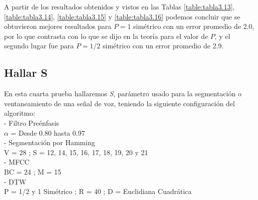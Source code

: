 A partir de los resultados obtenidos y vistos en las Tablas \ref{table:tabla3.13}, \ref{table:tabla3.14}, \ref{table:tabla3.15} y \ref{table:tabla3.16} podemos concluir que se obtuvieron mejores resultados para $P = 1$ simétrico con un error promedio de 2.0, por lo que contrasta con lo que se dijo en la teoría para el valor de $P$, y el segundo lugar fue para $P = 1/2$ simétrico con un error promedio de 2.9.

\subsection{Hallar S}
En esta cuarta prueba hallaremos \textit{S}, parámetro usado para la segmentación o ventaneamiento de una señal de voz, teniendo la siguiente configuración del algoritmo: \\
- Filtro Preénfasis \\
\hspace*{1cm} $\alpha$ = Desde 0.80 hasta 0.97 \\
- Segmentación por Hamming \\
\hspace*{1cm} V = 28 ; \qquad S = 12, 14, 15, 16, 17, 18, 19, 20 y 21 \\
- MFCC \\
\hspace*{1cm} BC = 24 ; \qquad M = 15 \\
- DTW \\
\hspace*{1cm} P = 1/2 y 1 Simétrico ; \qquad R = 40 ; \qquad D = Euclidiana Cuadrática
\vskip -1.0cm
